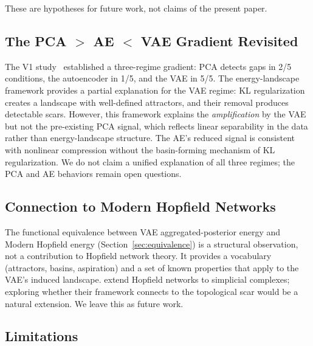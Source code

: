 \documentclass[11pt]{article}
\begin{document}
These are hypotheses for future work, not claims of the present paper.


\subsection{The PCA $>$ AE $<$ VAE Gradient Revisited}
\label{sec:gradient}

The V1 study~\citep{rigaud2026gap} established a three-regime gradient:
PCA detects gaps in 2/5 conditions, the autoencoder in 1/5, and the VAE
in 5/5.
The energy-landscape framework provides a partial explanation for the VAE
regime: KL regularization creates a landscape with well-defined attractors,
and their removal produces detectable scars.
However, this framework explains the \emph{amplification} by the VAE but
not the pre-existing PCA signal, which reflects linear separability in
the data rather than energy-landscape structure.
The AE's reduced signal is consistent with nonlinear compression without
the basin-forming mechanism of KL regularization.
We do not claim a unified explanation of all three regimes; the PCA and AE
behaviors remain open questions.


\subsection{Connection to Modern Hopfield Networks}
\label{sec:hopfield_disc}

The functional equivalence between VAE aggregated-posterior energy and Modern
Hopfield energy (Section~\ref{sec:equivalence}) is a structural observation,
not a contribution to Hopfield network theory.
It provides a vocabulary (attractors, basins, aspiration) and a set of
known properties that apply to the VAE's induced landscape.
\citet{burns2023simplicial} extend Hopfield networks to simplicial
complexes; exploring whether their framework connects to the topological
scar would be a natural extension.
We leave this as future work.


\subsection{Limitations}
\label{sec:limitations}
\end{document}
